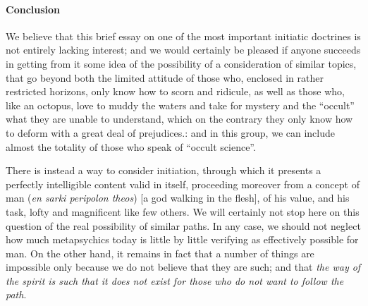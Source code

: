 \paragraph{Conclusion}
We believe that this brief essay on one of the most important initiatic doctrines is not entirely lacking interest; and we would certainly be pleased if anyone succeeds in getting from it some idea of the possibility of a consideration of similar topics, that go beyond both the limited attitude of those who, enclosed in rather restricted horizons, only know how to scorn and ridicule, as well as those who, like an octopus, love to muddy the waters and take for mystery and the “occult” what they are unable to understand, which on the contrary they only know how to deform with a great deal of prejudices.: and in this group, we can include almost the totality of those who speak of “occult science”.

There is instead a way to consider initiation, through which it presents a perfectly intelligible content valid in itself, proceeding moreover from a concept of man (\textit{en sarki peripolon theos}) [a god walking in the flesh], of his value, and his task, lofty and magnificent like few others. We will certainly not stop here on this question of the real possibility of similar paths. In any case, we should not neglect how much metapsychics today is little by little verifying as effectively possible for man. On the other hand, it remains in fact that a number of things are impossible only because we do not believe that they are such; and that \textit{the way of the spirit is such that it does not exist for those who do not want to follow the path}.



